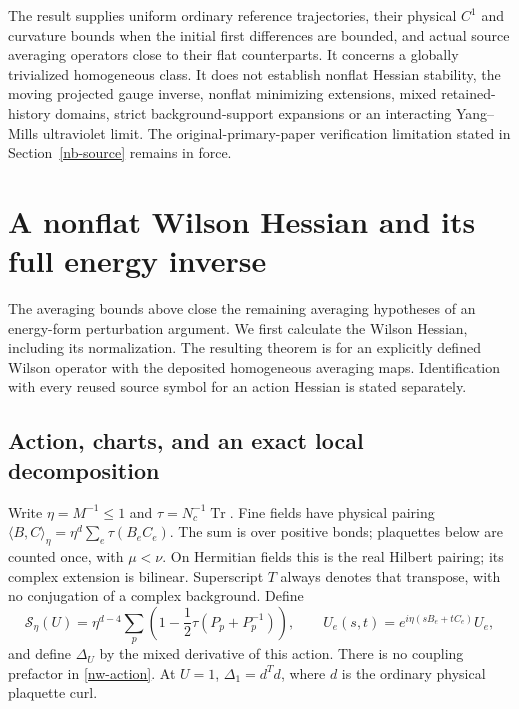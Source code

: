 \documentclass[11pt]{article}
\theoremstyle{remark}
\newcommand{\norm}[1]{\left\|#1\right\|}
\begin{document}
The result supplies uniform ordinary reference trajectories,
their physical $C^1$ and curvature bounds when the initial
first differences are bounded, and actual source averaging
operators close to their flat counterparts. It concerns a
globally trivialized homogeneous class. It does not establish
nonflat Hessian stability, the moving projected gauge inverse,
nonflat minimizing extensions, mixed retained-history domains,
strict background-support expansions or an interacting
Yang--Mills ultraviolet limit. The original-primary-paper
verification limitation stated in Section~\ref{nb-source}
remains in force.


\section{A nonflat Wilson Hessian and its full energy inverse}
\label{nw-section}

The averaging bounds above close the remaining averaging hypotheses
of an energy-form perturbation argument. We first calculate the
Wilson Hessian, including its normalization. The resulting theorem
is for an explicitly defined Wilson operator with the deposited
homogeneous averaging maps. Identification with every reused source
symbol for an action Hessian is stated separately.

\subsection{Action, charts, and an exact local decomposition}
\label{nw-wilson}

Write $\eta=M^{-1}\le1$ and $\tau=N_c^{-1}\operatorname{Tr}$.
Fine fields have physical pairing
$\langle B,C\rangle_\eta=\eta^d\sum_e\tau(B_eC_e)$.
The sum is over positive bonds; plaquettes below are counted once,
with $\mu<\nu$. On Hermitian fields this is the real Hilbert pairing;
its complex extension is bilinear. Superscript $T$ always denotes
that transpose, with no conjugation of a complex background.
Define
\begin{equation}\label{nw-action}
 \mathcal S_\eta(U)=\eta^{d-4}\sum_p
   \left(1-\frac12\tau(P_p+P_p^{-1})\right),\qquad
 U_e(s,t)=e^{i\eta(sB_e+tC_e)}U_e,
\end{equation}
and define $\Delta_U$ by the mixed derivative of this action.
There is no coupling prefactor in \eqref{nw-action}. At $U=1$,
$\Delta_1=d^Td$, where $d$ is the ordinary physical plaquette curl.
\end{document}

